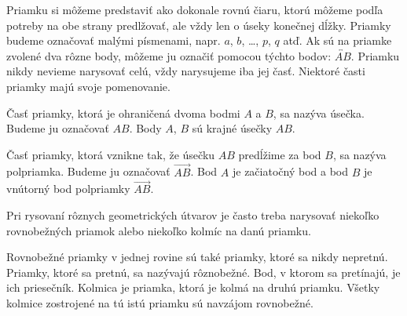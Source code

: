 \documentclass{report}
\begin{document}
Priamku si môžeme predstaviť ako dokonale rovnú čiaru, ktorú môžeme podľa potreby na obe strany predlžovať, ale vždy len o úseky konečnej dĺžky. Priamky budeme označovať malými písmenami, napr. \(a\), \(b\), \dots, \(p\), \(q\) atď. Ak sú na priamke zvolené dva rôzne body, môžeme ju označiť pomocou týchto bodov: \(\overleftrightarrow{AB}\). Priamku nikdy nevieme narysovať celú, vždy narysujeme iba jej časť. Niektoré časti priamky majú svoje pomenovanie.



Časť priamky, ktorá je ohraničená dvoma bodmi \(A\) a \(B\), sa nazýva úsečka. Budeme ju označovať \(AB\). Body \(A\), \(B\) sú krajné úsečky \(AB\).


Časť priamky, ktorá vznikne tak, že úsečku \(AB\) predĺžime za bod \(B\), sa nazýva polpriamka. Budeme ju označovať \(\overrightarrow{AB}\). Bod \(A\) je začiatočný bod a bod \(B\) je vnútorný bod polpriamky \(\overrightarrow{AB}\).



Pri rysovaní rôznych geometrických útvarov je často treba narysovať niekoľko rovnobežných priamok alebo niekoľko kolmíc na danú priamku.

Rovnobežné priamky v jednej rovine sú také priamky, ktoré sa nikdy nepretnú. Priamky, ktoré sa pretnú, sa nazývajú rôznobežné. Bod, v ktorom sa pretínajú, je ich priesečník. Kolmica je priamka, ktorá je kolmá na druhú priamku. Všetky kolmice zostrojené na tú istú priamku sú navzájom rovnobežné.
\end{document}
